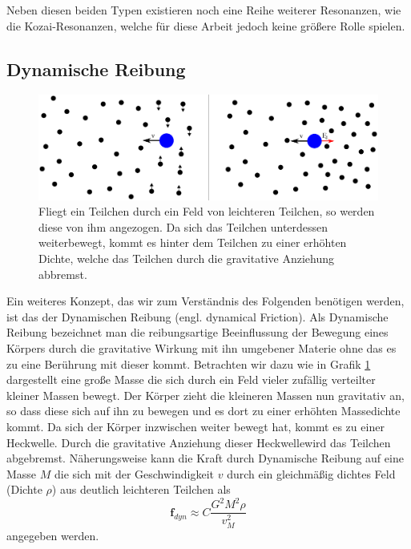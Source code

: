 \documentclass[12pt,a4paper,twoside]{article}
\begin{document}
Neben diesen beiden Typen existieren noch eine Reihe weiterer Resonanzen, wie die Kozai-Resonanzen, welche für diese Arbeit jedoch keine größere Rolle spielen. %

\subsection{Dynamische Reibung}
\begin{figure}
\centering
\includegraphics[scale=0.4]{img/dynamischeReibung}
\caption{Fliegt ein Teilchen durch ein Feld von leichteren Teilchen, so werden diese von ihm angezogen. Da sich das Teilchen unterdessen weiterbewegt, kommt es hinter dem Teilchen zu einer erhöhten Dichte, welche das Teilchen durch die gravitative Anziehung abbremst.}
\label{fig:df}
\end{figure}
Ein weiteres Konzept, das wir zum Verständnis des Folgenden benötigen werden, ist das der Dynamischen Reibung (engl. dynamical Friction). Als Dynamische Reibung bezeichnet man die reibungsartige Beeinflussung der Bewegung eines Körpers durch die gravitative Wirkung mit ihn umgebener Materie ohne das es zu eine Berührung mit dieser kommt.
Betrachten wir dazu wie in Grafik \ref{fig:df} dargestellt eine große Masse die sich durch ein Feld vieler zufällig verteilter kleiner Massen bewegt. Der Körper zieht die kleineren Massen nun gravitativ an, so dass diese sich auf ihn zu bewegen und es dort zu einer erhöhten Massedichte kommt. Da sich der Körper inzwischen weiter bewegt hat, kommt es zu einer \glqq Heckwelle\grqq. Durch die gravitative Anziehung dieser \glqq Heckwelle\grqq wird das Teilchen abgebremst.
Näherungsweise kann die Kraft durch Dynamische Reibung auf eine Masse $M$ die sich mit der Geschwindigkeit $v$ durch ein gleichmäßig dichtes Feld (Dichte $\rho$) aus deutlich leichteren Teilchen als
\begin{equation}\label{eq:df}
\textbf{f}_{dyn} \approx C \frac{G^2 M^2 \rho}{v^2_M}
\end{equation}
angegeben werden.
\end{document}
